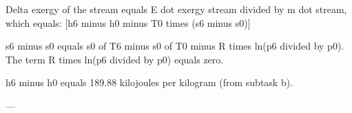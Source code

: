 Delta exergy of the stream equals E dot exergy stream divided by m dot stream, which equals:  
[h6 minus h0 minus T0 times (s6 minus s0)]  

s6 minus s0 equals s0 of T6 minus s0 of T0 minus R times ln(p6 divided by p0).  
The term R times ln(p6 divided by p0) equals zero.  

h6 minus h0 equals 189.88 kilojoules per kilogram (from subtask b).  

---
